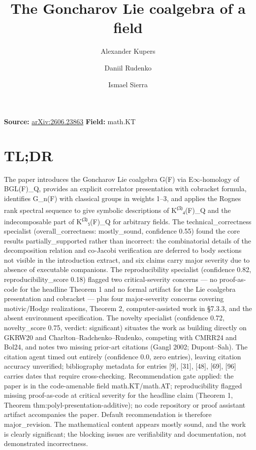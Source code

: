 \documentclass[11pt]{article}
\title{The Goncharov Lie coalgebra of a field}
\author{Alexander Kupers \and Daniil Rudenko \and Ismael Sierra}
\date{}
\begin{document}
\maketitle

\noindent\textbf{Source:} \href{https://arxiv.org/abs/2606.23863}{arXiv:2606.23863} \quad \textbf{Field:} math.KT\\

\section*{TL;DR}
The paper introduces the Goncharov Lie coalgebra G(F) via E\ensuremath{\infty}-homology of BGL(F)\_Q, provides an explicit correlator presentation with cobracket formula, identifies G\_n(F) with classical groups in weights 1--3, and applies the Rognes rank spectral sequence to give symbolic descriptions of K⁽\textsuperscript{3}⁾₄(F)\_Q and the indecomposable part of K⁽\textsuperscript{3}⁾₅(F)\_Q for arbitrary fields. The technical\_correctness specialist (overall\_correctness: mostly\_sound, confidence 0.55) found the core results partially\_supported rather than incorrect: the combinatorial details of the decomposition relation and co-Jacobi verification are deferred to body sections not visible in the introduction extract, and six claims carry major severity due to absence of executable companions. The reproducibility specialist (confidence 0.82, reproducibility\_score 0.18) flagged two critical-severity concerns --- no proof-as-code for the headline Theorem 1 and no formal artifact for the Lie coalgebra presentation and cobracket --- plus four major-severity concerns covering motivic/Hodge realizations, Theorem 2, computer-assisted work in §7.3.3, and the absent environment specification. The novelty specialist (confidence 0.72, novelty\_score 0.75, verdict: significant) situates the work as building directly on GKRW20 and Charlton--Radchenko--Rudenko, competing with CMRR24 and Bol24, and notes two missing prior-art citations (Gangl 2002; Dupont--Sah). The citation agent timed out entirely (confidence 0.0, zero entries), leaving citation accuracy unverified; bibliography metadata for entries [9], [31], [48], [69], [96] carries dates that require cross-checking. Recommendation gate applied: the paper is in the code-amenable field math.KT/math.AT; reproducibility flagged missing proof-as-code at critical severity for the headline claim (Theorem 1, Theorem thm:polyl-presentation-additive); no code repository or proof assistant artifact accompanies the paper. Default recommendation is therefore major\_revision. The mathematical content appears mostly sound, and the work is clearly significant; the blocking issues are verifiability and documentation, not demonstrated incorrectness.
\end{document}
